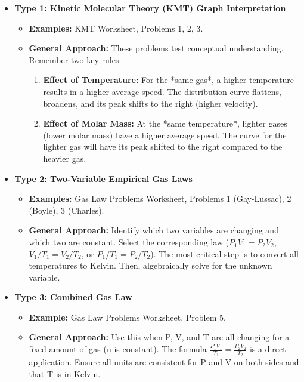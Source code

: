 \documentclass{article}
\begin{document}
\begin{itemize}
    \item \textbf{Type 1: Kinetic Molecular Theory (KMT) Graph Interpretation}
        \begin{itemize}
            \item \textbf{Examples:} KMT Worksheet, Problems 1, 2, 3.
            \item \textbf{General Approach:} These problems test conceptual understanding. Remember two key rules:
                \begin{enumerate}
                    \item \textbf{Effect of Temperature:} For the *same gas*, a higher temperature results in a higher average speed. The distribution curve flattens, broadens, and its peak shifts to the right (higher velocity).
                    \item \textbf{Effect of Molar Mass:} At the *same temperature*, lighter gases (lower molar mass) have a higher average speed. The curve for the lighter gas will have its peak shifted to the right compared to the heavier gas.
                \end{enumerate}
        \end{itemize}

    \item \textbf{Type 2: Two-Variable Empirical Gas Laws}
        \begin{itemize}
            \item \textbf{Examples:} Gas Law Problems Worksheet, Problems 1 (Gay-Lussac), 2 (Boyle), 3 (Charles).
            \item \textbf{General Approach:} Identify which two variables are changing and which two are constant. Select the corresponding law ($P_1V_1=P_2V_2$, $V_1/T_1=V_2/T_2$, or $P_1/T_1=P_2/T_2$). The most critical step is to convert all temperatures to Kelvin. Then, algebraically solve for the unknown variable.
        \end{itemize}

    \item \textbf{Type 3: Combined Gas Law}
        \begin{itemize}
            \item \textbf{Example:} Gas Law Problems Worksheet, Problem 5.
            \item \textbf{General Approach:} Use this when P, V, and T are all changing for a fixed amount of gas (n is constant). The formula $\frac{P_1V_1}{T_1} = \frac{P_2V_2}{T_2}$ is a direct application. Ensure all units are consistent for P and V on both sides and that T is in Kelvin.
        \end{itemize}


\end{itemize}
\end{document}
